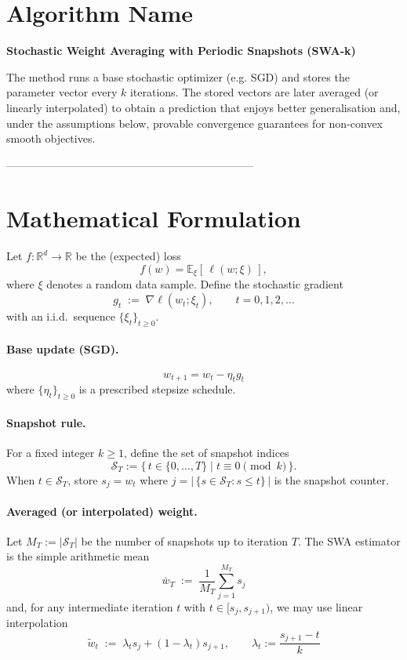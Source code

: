 \documentclass{article}
\newcommand{\E}{\mathbb{E}}
\newcommand{\R}{\mathbb{R}}
\begin{document}
\section*{Algorithm Name}
\textbf{Stochastic Weight Averaging with Periodic Snapshots (SWA‑k)}  

The method runs a base stochastic optimizer (e.g. SGD) and stores the
parameter vector every $k$ iterations.  The stored vectors are later
averaged (or linearly interpolated) to obtain a prediction that enjoys
better generalisation and, under the assumptions below, provable
convergence guarantees for non‑convex smooth objectives.

--------------------------------------------------------------------

\section*{Mathematical Formulation}
Let $f:\R^{d}\rightarrow\R$ be the (expected) loss
\[
f(w)=\E_{\xi}[\,\ell(w;\xi)\,],
\]
where $\xi$ denotes a random data sample.  
Define the stochastic gradient
\[
g_t \;:=\; \nabla\ell(w_t;\xi_t),\qquad t=0,1,2,\dots
\]
with an i.i.d.\ sequence $\{\xi_t\}_{t\ge 0}$.  

\paragraph{Base update (SGD).}
\[
\boxed{w_{t+1}=w_t-\eta_t g_t}\tag{1}
\]
where $\{\eta_t\}_{t\ge0}$ is a prescribed stepsize schedule.

\paragraph{Snapshot rule.}
For a fixed integer $k\ge 1$, define the set of snapshot indices
\[
\mathcal{S}_T:=\{\,t\in\{0,\dots,T\}\mid t\equiv 0\pmod{k}\,\}.
\]
When $t\in\mathcal{S}_T$, store $s_{j}=w_t$ where $j=|\,\{s\in\mathcal{S}_T: s\le t\}\,|$ is the
snapshot counter.

\paragraph{Averaged (or interpolated) weight.}
Let $M_T:=|\mathcal{S}_T|$ be the number of snapshots up to iteration $T$.
The SWA estimator is the simple arithmetic mean
\[
\boxed{\bar w_T \;:=\; \frac{1}{M_T}\sum_{j=1}^{M_T}s_j}\tag{2}
\]
and, for any intermediate iteration $t$ with $t\in[s_j,s_{j+1})$, we may use
linear interpolation
\[
\boxed{\tilde w_t \;:=\; \lambda_t s_j+(1-\lambda_t)s_{j+1},
\qquad 
\lambda_t:=\frac{s_{j+1}-t}{k}}\tag{3}
\]
\end{document}
